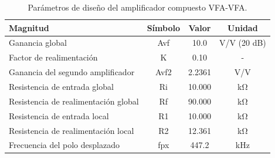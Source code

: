 \begin{table}[H]
\centering
\begin{tabular}{lccc}
\toprule
Magnitud & Símbolo & Valor & Unidad \\
\midrule
Ganancia global & Avf & 10.0 & V/V (20 dB) \\
Factor de realimentación & K & 0.10 & - \\
Ganancia del segundo amplificador & Avf2 & 2.2361 & V/V \\
Resistencia de entrada global & Ri & 10.000 & kΩ \\
Resistencia de realimentación global & Rf & 90.000 & kΩ \\
Resistencia de entrada local & R1 & 10.000 & kΩ \\
Resistencia de realimentación local & R2 & 12.361 & kΩ \\
Frecuencia del polo desplazado & fpx & 447.2 & kHz \\
\bottomrule
\end{tabular}
\caption{Parámetros de diseño del amplificador compuesto VFA-VFA.}
\label{tab:diseno_c1}
\end{table}